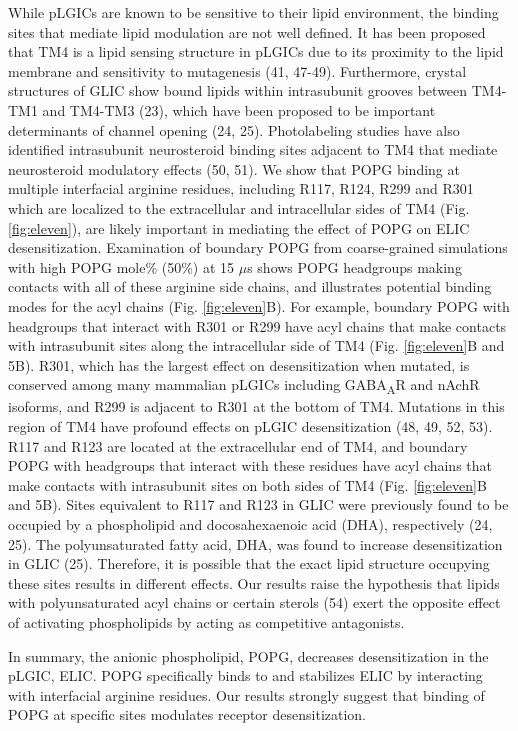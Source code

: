 While pLGICs are known to be sensitive to their lipid environment, the
binding sites that mediate lipid modulation are not well defined. It has
been proposed that TM4 is a lipid sensing structure in pLGICs due to its
proximity to the lipid membrane and sensitivity to mutagenesis (41,
47-49). Furthermore, crystal structures of GLIC show bound lipids within
intrasubunit grooves between TM4-TM1 and TM4-TM3 (23), which have been
proposed to be important determinants of channel opening (24, 25).
Photolabeling studies have also identified intrasubunit neurosteroid
binding sites adjacent to TM4 that mediate neurosteroid modulatory
effects (50, 51). We show that POPG binding at multiple interfacial
arginine residues, including R117, R124, R299 and R301 which are
localized to the extracellular and intracellular sides of TM4 (Fig. \ref{fig:eleven}),
are likely important in mediating the effect of POPG on ELIC
desensitization. Examination of boundary POPG from coarse-grained
simulations with high POPG mole\% (50\%) at 15 $\mu$s shows POPG headgroups
making contacts with all of these arginine side chains, and illustrates
potential binding modes for the acyl chains (Fig. \ref{fig:eleven}B). For example,
boundary POPG with headgroups that interact with R301 or R299 have acyl
chains that make contacts with intrasubunit sites along the
intracellular side of TM4 (Fig. \ref{fig:eleven}B and 5B). R301, which has the largest
effect on desensitization when mutated, is conserved among many
mammalian pLGICs including GABA\textsubscript{A}R and nAchR isoforms,
and R299 is adjacent to R301 at the bottom of TM4. Mutations in this
region of TM4 have profound effects on pLGIC desensitization (48, 49,
52, 53). R117 and R123 are located at the extracellular end of TM4, and
boundary POPG with headgroups that interact with these residues have
acyl chains that make contacts with intrasubunit sites on both sides of
TM4 (Fig. \ref{fig:eleven}B and 5B). Sites equivalent to R117 and R123 in GLIC were
previously found to be occupied by a phospholipid and docosahexaenoic
acid (DHA), respectively (24, 25). The polyunsaturated fatty acid, DHA,
was found to increase desensitization in GLIC (25). Therefore, it is
possible that the exact lipid structure occupying these sites results in
different effects. Our results raise the hypothesis that lipids with
polyunsaturated acyl chains or certain sterols (54) exert the opposite
effect of activating phospholipids by acting as competitive antagonists.

In summary, the anionic phospholipid, POPG, decreases desensitization in
the pLGIC, ELIC. POPG specifically binds to and stabilizes ELIC by
interacting with interfacial arginine residues. Our results strongly
suggest that binding of POPG at specific sites modulates receptor
desensitization.

